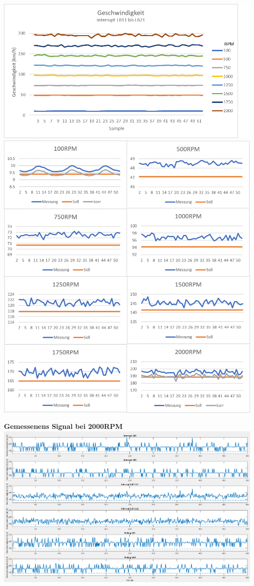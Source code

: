 \includegraphics[width=\textwidth]{images/auswertungSpeedUeb.png}\\
\includegraphics[width=\textwidth]{images/auswertungSpeed.png}\\
\clearpage

\textbf{Gemessenens Signal bei 2000RPM}\newline
\includegraphics[width=\textwidth]{images/sig2000.png}\\

